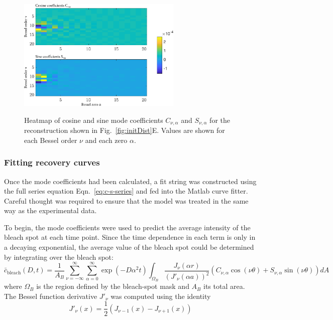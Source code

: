 \begin{figure}
\caption[Heatmap of mode coefficients.]{Heatmap of cosine and sine mode coefficients $C_{\nu,\alpha}$ and $S_{\nu,\alpha}$ for the reconstruction shown in Fig.~\ref{fig:initDist}E. Values are shown for each Bessel order $\nu$ and each zero $\alpha$. \\}
\centering
\includegraphics[width=0.7\textwidth]{figs/ch04/rec_16_cos_sin_array_20_terms.pdf}
\label{fig:arrays}
\end{figure} 

\subsubsection{Fitting recovery curves}

Once the mode coefficients had been calculated, a fit string was constructed using the full series equation Eqn.~\ref{eq:c-s-series} and fed into the Matlab curve fitter.  Careful thought was required to ensure that the model was treated in the same way as the experimental data.

To begin, the mode coefficients were used to predict the average intensity of the bleach spot at each time point.  Since the time dependence in each term is only in a decaying exponential, the average value of the bleach spot could be determined by integrating over the bleach spot:
\begin{equation}
\bar{c}_\mathrm{bleach}(D,t) = \frac{1}{A_B}\sum_{\nu=-\infty}^{\infty} \sum_{\alpha = 0}^\infty   \exp\left(-D\alpha^2t\right)\int_{\Omega_B}\frac{J_\nu\left(\alpha r\right)}{\left(J'_\nu (\alpha a)\right)^2} \left(C_{\nu,\alpha}\cos(\nu\theta) + S_{\nu,\alpha} \sin(\nu\theta)\right) dA
\label{eq:c-s-series}
\end{equation}
where $\Omega_B$ is the region defined by the bleach-spot mask and $A_B$ its total area.  The Bessel function derivative $J'_\nu$ was computed using the identity
\begin{equation*}
J'_\nu(x) = \frac{1}{2}\left(J_{\nu-1}(x) - J_{\nu+1}(x)\right)
\end{equation*}

